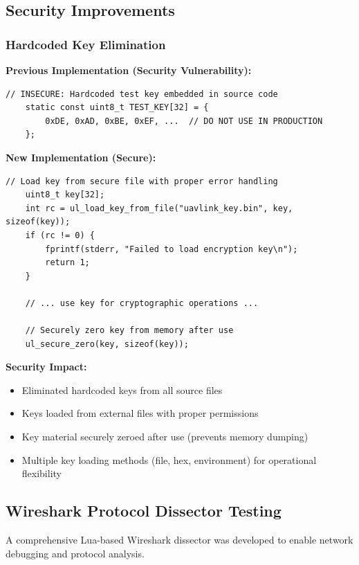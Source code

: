\documentclass[11pt,a4paper]{article}
\begin{document}
\subsection{Security Improvements}

\subsubsection{Hardcoded Key Elimination}

\textbf{Previous Implementation (Security Vulnerability):}
\begin{lstlisting}[basicstyle=\ttfamily\footnotesize]
	// INSECURE: Hardcoded test key embedded in source code
	static const uint8_t TEST_KEY[32] = {
		0xDE, 0xAD, 0xBE, 0xEF, ...  // DO NOT USE IN PRODUCTION
	};
\end{lstlisting}

\textbf{New Implementation (Secure):}
\begin{lstlisting}[basicstyle=\ttfamily\footnotesize]
	// Load key from secure file with proper error handling
	uint8_t key[32];
	int rc = ul_load_key_from_file("uavlink_key.bin", key, sizeof(key));
	if (rc != 0) {
		fprintf(stderr, "Failed to load encryption key\n");
		return 1;
	}
	
	// ... use key for cryptographic operations ...
	
	// Securely zero key from memory after use
	ul_secure_zero(key, sizeof(key));
\end{lstlisting}

\textbf{Security Impact:}
\begin{itemize}[noitemsep]
	\item[\textcolor{codegreen}{\textbf{FIXED}}] Eliminated hardcoded keys from all source files
	\item[\textcolor{codegreen}{\textbf{FIXED}}] Keys loaded from external files with proper permissions
	\item[\textcolor{codegreen}{\textbf{FIXED}}] Key material securely zeroed after use (prevents memory dumping)
	\item[\textcolor{codegreen}{\textbf{FIXED}}] Multiple key loading methods (file, hex, environment) for operational flexibility
\end{itemize}

\subsection{Wireshark Protocol Dissector Testing}

A comprehensive Lua-based Wireshark dissector was developed to enable network debugging and protocol analysis.
\end{document}
